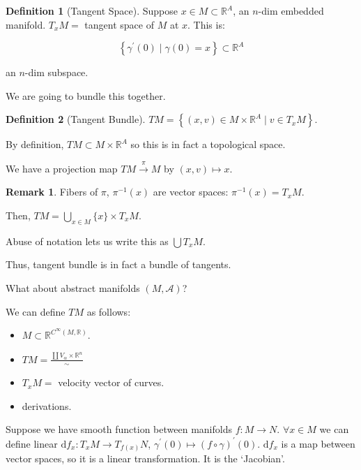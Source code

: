 \documentclass{article}
\theoremstyle{definition}
\newtheorem*{definition}{Definition}
\newtheorem*{remark}{Remark}
\begin{document}
    \begin{definition}
        [Tangent Space] Suppose \(x\in M \subset \mathbb{R}^A\), an \(n\)-dim embedded manifold. \(T_x M =\) tangent space of \(M\) at \(x\). This is:
        
        \[
            \left\{ \gamma ^{\prime} (0) \mid \gamma(0) = x \right\} \subset \mathbb{R}^A
        \]

        an \(n\)-dim subspace.
    \end{definition}

    We are going to bundle this together.

    \begin{definition}
        [Tangent Bundle]

        \(TM = \left\{ (x,v) \in M \times \mathbb{R}^A \mid v\in T_x M \right\}\).

        By definition, \(TM \subset M \times \mathbb{R}^A\) so this is in fact a topological space.

        We have a projection map \(TM \xrightarrow{\pi} M\) by \((x,v) \mapsto x\).
    \end{definition}

    \begin{remark}
        Fibers of \(\pi\), \(\pi ^{-1} (x)\) are vector spaces: \(\pi ^{-1} (x) = T_x M\).

        Then, \(TM = \bigcup_{x\in M} \{ x \} \times T_x M\).

        Abuse of notation lets us write this as \(\bigcup T_x M\).

        Thus, tangent bundle is in fact a bundle of tangents.
    \end{remark}

    What about abstract manifolds \((M,\mathcal{A})\)?

    We can define \(TM\) as follows:

    \begin{itemize}
        \item \(M \subset \mathbb{R}^{C^{\infty}(M,\mathbb{R})}\).
        \item \(TM = \frac{\coprod V_\alpha \times \mathbb{R}^n}{\sim}\)
        \item \(T_x M =\) velocity vector of curves.
        \item derivations.
    \end{itemize} 

    Suppose we have smooth function between manifolds \(f: M \to N\). \(\forall x\in M\) we can define linear \(\mathrm{d}f_x : T_x M \to T_{f(x)} N\), \(\gamma ^{\prime} (0) \mapsto (f \circ \gamma)^{\prime} (0)\). \(\mathrm{d} f_x\) is a map between vector spaces, so it is a linear transformation. It is the `Jacobian'.
    
\end{document}
